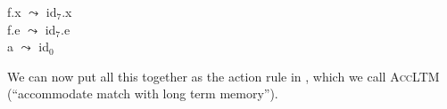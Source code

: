 \begin{ex}
\begin{subex}
\item  f.x $\leadsto$ id$_7$.x\\
       f.e $\leadsto$ id$_7$.e\\
       a $\leadsto$ id$_0$

\item {} 
 
\end{subex} 
   
\end{ex} 


 
We can now put all this together as the action rule in \nexteg{},
which we call \textsc{AccLTM} (``accommodate match with long term
memory'').  

